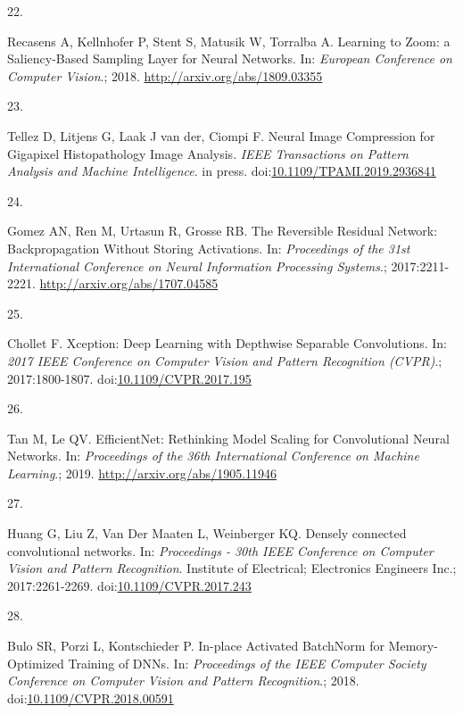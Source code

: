 \documentclass[
  12pt,
  a5,margin=2cmpaper,
]{article}
\newlength{\cslhangindent}
\newlength{\csllabelwidth}
\newlength{\cslentryspacingunit} %
\newenvironment{CSLReferences}[2] %
 {%
  \setlength{\parindent}{0pt}
  \ifodd #1
  \let\oldpar\par
  \def\par{\hangindent=\cslhangindent\oldpar}
  \fi
  \setlength{\parskip}{#2\cslentryspacingunit}
 }%
 {}
\newcommand{\CSLLeftMargin}[1]{\parbox[t]{\csllabelwidth}{#1}}
\newcommand{\CSLRightInline}[1]{\parbox[t]{\linewidth - \csllabelwidth}{#1}\break}
\begin{document}
\begin{CSLReferences}{0}{0}
\leavevmode{}%
\CSLLeftMargin{22. }%
\CSLRightInline{Recasens A, Kellnhofer P, Stent S, Matusik W, Torralba
A. {Learning to Zoom: a Saliency-Based Sampling Layer for Neural
Networks}. In: \emph{European Conference on Computer Vision}.; 2018.
\url{http://arxiv.org/abs/1809.03355}}

\leavevmode{}%
\CSLLeftMargin{23. }%
\CSLRightInline{Tellez D, Litjens G, Laak J van der, Ciompi F. {Neural
Image Compression for Gigapixel Histopathology Image Analysis}.
\emph{IEEE Transactions on Pattern Analysis and Machine Intelligence}.
in press.
doi:\href{https://doi.org/10.1109/TPAMI.2019.2936841}{10.1109/TPAMI.2019.2936841}}

\leavevmode{}%
\CSLLeftMargin{24. }%
\CSLRightInline{Gomez AN, Ren M, Urtasun R, Grosse RB. {The Reversible
Residual Network: Backpropagation Without Storing Activations}. In:
\emph{Proceedings of the 31st International Conference on Neural
Information Processing Systems}.; 2017:2211-2221.
\url{http://arxiv.org/abs/1707.04585}}

\leavevmode{}%
\CSLLeftMargin{25. }%
\CSLRightInline{Chollet F. {Xception: Deep Learning with Depthwise
Separable Convolutions}. In: \emph{2017 IEEE Conference on Computer
Vision and Pattern Recognition (CVPR)}.; 2017:1800-1807.
doi:\href{https://doi.org/10.1109/CVPR.2017.195}{10.1109/CVPR.2017.195}}

\leavevmode{}%
\CSLLeftMargin{26. }%
\CSLRightInline{Tan M, Le QV. {EfficientNet: Rethinking Model Scaling
for Convolutional Neural Networks}. In: \emph{Proceedings of the 36th
International Conference on Machine Learning}.; 2019.
\url{http://arxiv.org/abs/1905.11946}}

\leavevmode{}%
\CSLLeftMargin{27. }%
\CSLRightInline{Huang G, Liu Z, Van Der Maaten L, Weinberger KQ.
{Densely connected convolutional networks}. In: \emph{Proceedings - 30th
IEEE Conference on Computer Vision and Pattern Recognition}. Institute
of Electrical; Electronics Engineers Inc.; 2017:2261-2269.
doi:\href{https://doi.org/10.1109/CVPR.2017.243}{10.1109/CVPR.2017.243}}

\leavevmode{}%
\CSLLeftMargin{28. }%
\CSLRightInline{Bulo SR, Porzi L, Kontschieder P. {In-place Activated
BatchNorm for Memory-Optimized Training of DNNs}. In: \emph{Proceedings
of the IEEE Computer Society Conference on Computer Vision and Pattern
Recognition}.; 2018.
doi:\href{https://doi.org/10.1109/CVPR.2018.00591}{10.1109/CVPR.2018.00591}}


\end{CSLReferences}
\end{document}
